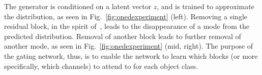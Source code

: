 The generator is conditioned on a latent vector $z$, and is trained to approximate the distribution, as seen in Fig.~\ref{fig:onedexperiment} (left). 
Removing a single residual block, in the spirit of~\cite{veit2016residual}, leads to the disappearance of a mode from the predicted distribution. 
Removal of another block leads to further removal of another mode, as seen in Fig.~\ref{fig:onedexperiment}  (mid, right). 
The purpose of the gating network, thus, is to enable the network to learn which blocks (or more specifically, which channels) to attend to for each object class. %







